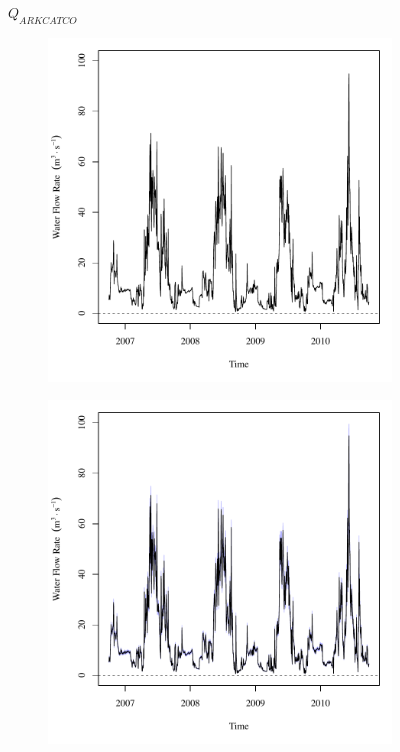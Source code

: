 \begin{linenumbers}
\subfiguretop
\begin{landscape}
	\begin{figure}
		\centering
		$ Q_{ARKCATCO} $
		\begin{subfigure}{0.7\textwidth}
			\centering
			\includegraphics[width=\tableCustomSize]{"Figures/Results_USR/Deterministic/Q U163"}
		\end{subfigure}%
		\begin{subfigure}{0.7\textwidth}
			\centering
			\includegraphics[width=\tableCustomSize]{"Figures/Results_USR/Stochastic/Q U163"}

\end{subfigure}
\end{figure}
\end{landscape}
\end{linenumbers}
